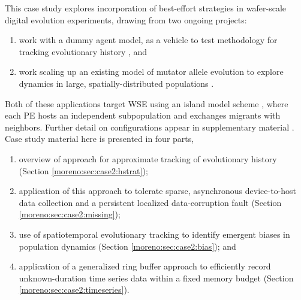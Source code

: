 This case study explores incorporation of best-effort strategies in wafer-scale digital evolution experiments, drawing from two ongoing projects:
\begin{enumerate}
\item work with a dummy agent model, as a vehicle to test methodology for tracking evolutionary history \cite{singhvi2025scalable}, and
\item work scaling up an existing model of mutator allele evolution to explore dynamics in large, spatially-distributed populations \cite{raynes2018sign,moreno2025hypermutatorsc}.
\end{enumerate}
Both of these applications target WSE using an island model scheme \cite{bennett1999building}, where each PE hosts an independent subpopulation and exchanges migrants with neighbors.
Further detail on configurations appear in supplementary material \cite{moreno_2026_trust}.
Case study material here is presented in four parts,
\begin{enumerate}
\item overview of approach for approximate tracking of evolutionary history (Section \ref{moreno:sec:case2:hstrat});
\item application of this approach to tolerate sparse, asynchronous device-to-host data collection and a persistent localized data-corruption fault (Section \ref{moreno:sec:case2:missing});
\item use of spatiotemporal evolutionary tracking to identify emergent biases in population dynamics (Section \ref{moreno:sec:case2:bias}); and
\item application of a generalized ring buffer approach to efficiently record unknown-duration time series data within a fixed memory budget (Section \ref{moreno:sec:case2:timeseries}).
\end{enumerate}



